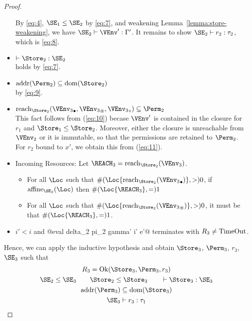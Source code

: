 \begin{proof}
\begin{itemize}
    By \eqref{eq:4}, $\SE_1\le\SE_2$ by \eqref{eq:7}, and weakening
    Lemma~\ref{lemma:store-weakening}, we have
    $\SE_2 \vdash \VEnv' : \E'$.
    It remains to show $\SE_2 \vdash r_2 : \tau_2$, which is
    \eqref{eq:8}.
  \item  $\vdash \Store_2 : \SE_2$\\
    holds by \eqref{eq:7}.
  \item  $\Addresses{\Perm_2} \subseteq \Dom{\Store_2}$\\
    by \eqref{eq:9}.
  \item $\Reach{\Store_2}{\Active{\VEnv_3}, \MutableBorrows{\VEnv_3}, \ImmutableBorrows{\VEnv_3}} \subseteq \Perm_2$\\
    This fact follows from (\ref{eq:10}) becase $\VEnv'$ is contained
    in the closure for $r_1$ and $\Store_1 \le \Store_2$. Moreover,
    either the closure is unreachable from $\VEnv_2$ or it is
    immutable, so that the permissions are retained to $\Perm_2$.
    For $r_2$ bound to $x'$, we obtain this from (\ref{eq:11}).
  \item Incoming Resources: Let $\REACH_3 = \Reach{\Store_2}{\VEnv_3}$.
    \begin{itemize}
    \item 
      For all $\Loc$ such that $\MultiNumber\Loc{\Reach{\Store_2}{\Active{\VEnv_3}}} >0$,
      if $\Affine{\SE_2}\Loc$ then $\MultiNumber\Loc{\REACH_3}= 1$
    \item For all $\Loc$ such that $
      \MultiNumber\Loc{\Reach{\Store_2}{\MutableBorrows{\VEnv_3}}} >0$, it
      must be that $\MultiNumber\Loc{\REACH_3}=1$.
    \end{itemize}
  \item $i'<i$ and  @eval delta_2 pi_2 gamma' i' e'@ terminates
    with $R_3 \ne \operatorname{TimeOut}$.
  \end{itemize}
  Hence, we can apply the inductive hypothesis and obtain
  $\Store_3$, $\Perm_3$, $r_3$, $\SE_3$ such that
  \begin{gather}
    R_3 = \Ok{\Store_3, \Perm_3, r_3}
    \\\label{eq:12}
    \SE_2 \le \SE_3 \qquad
    \Store_2 \le \Store_3 \qquad
    \vdash \Store_3 :  \SE_3
    \\\label{eq:13}
    \Addresses{\Perm_3} \subseteq \Dom{\Store_3}
    \\\label{eq:14}
    \SE_3 \vdash r_3 : \tau_1

\end{gather}
\end{proof}
